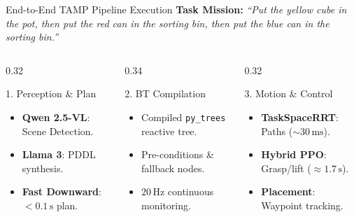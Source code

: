 \documentclass[10pt]{beamer}
\begin{document}
\begin{frame}{End-to-End TAMP Pipeline Execution}
    \footnotesize
    \textbf{Task Mission:} \textit{``Put the yellow cube in the pot, then put the red can in the sorting bin, then put the blue can in the sorting bin.''}
    
    \vspace{0.05cm}
    \begin{columns}[T]
        \begin{column}{0.32\textwidth}
            \begin{block}{1. Perception \& Plan}
                \begin{itemize}\scriptsize
                    \item \textbf{Qwen 2.5-VL}: Scene Detection.
                    \item \textbf{Llama 3}: PDDL synthesis.
                    \item \textbf{Fast Downward}: $<0.1\,\text{s}$ plan.
                \end{itemize}
            \end{block}
        \end{column}
        \begin{column}{0.34\textwidth}
            \begin{block}{2. BT Compilation}
                \begin{itemize}\scriptsize
                    \item Compiled \texttt{py\_trees} reactive tree.
                    \item Pre-conditions \& fallback nodes.
                    \item $20\,\text{Hz}$ continuous monitoring.
                \end{itemize}
            \end{block}
        \end{column}
        \begin{column}{0.32\textwidth}
            \begin{block}{3. Motion \& Control}
                \begin{itemize}\scriptsize
                    \item \textbf{TaskSpaceRRT}: Paths ($\sim 30\,\text{ms}$).
                    \item \textbf{Hybrid PPO}: Grasp/lift ($\approx 1.7\,\text{s}$).
                    \item \textbf{Placement}: Waypoint tracking.
                \end{itemize}
            \end{block}
        \end{column}
    \end{columns}


\end{frame}
\end{document}
